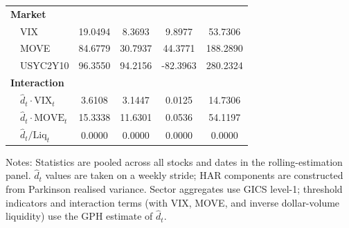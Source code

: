\begin{table}[htbp]
\begin{tabular}{llcccc}
\midrule
\multicolumn{6}{l}{\textbf{Market}} \\
  & VIX & 19.0494 & 8.3693 & 9.8977 & 53.7306 \\
  & MOVE & 84.6779 & 30.7937 & 44.3771 & 188.2890 \\
  & USYC2Y10 & 96.3550 & 94.2156 & -82.3963 & 280.2324 \\
\midrule
\multicolumn{6}{l}{\textbf{Interaction}} \\
  & $\hat d_t \cdot \mathrm{VIX}_t$ & 3.6108 & 3.1447 & 0.0125 & 14.7306 \\
  & $\hat d_t \cdot \mathrm{MOVE}_t$ & 15.3338 & 11.6301 & 0.0536 & 54.1197 \\
  & $\hat d_t / \mathrm{Liq}_t$ & 0.0000 & 0.0000 & 0.0000 & 0.0000 \\
\bottomrule
\end{tabular}
\begin{tablenotes}\small
\item Notes: Statistics are pooled across all stocks and dates in the rolling-estimation panel. $\hat d_t$ values are taken on a weekly stride; HAR components are constructed from Parkinson realised variance. Sector aggregates use GICS level-1; threshold indicators and interaction terms (with VIX, MOVE, and inverse dollar-volume liquidity) use the GPH estimate of $\hat d_t$.
\end{tablenotes}
\end{table}
